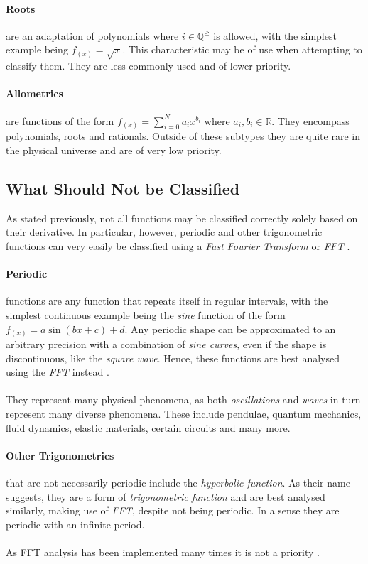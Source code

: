 \documentclass[main.tex]{subfiles}
\begin{document}
    \paragraph{Roots} are an adaptation of polynomials where $i \in \mathbb{Q}^\geq$ is allowed, with the simplest example being $f_{(x)}=\sqrt{x}$. This characteristic may be of use when attempting to classify them. They are less commonly used and of lower priority.
    
    \paragraph{Allometrics} are functions of the form $f_{(x)}=\sum_{i=0}^{N} a_i x^{b_i} $ where $a_i,b_i \in \mathbb{R}$. They encompass polynomials, roots and rationals. Outside of these subtypes they are quite rare in the physical universe and are of very low priority.
    
    \subsection{What Should Not be Classified}
    
    As stated previously, not all functions may be classified correctly solely based on their derivative. In particular, however, periodic and other trigonometric functions can very easily be classified using a \textit{Fast Fourier Transform} or \textit{FFT} \cite[Chapter~4]{fourierComp}.
    
    \paragraph{Periodic} functions are any function that repeats itself in regular intervals, with the simplest continuous example being the \textit{sine} function of the form $f_{(x)}=a \sin(b x + c) + d$. Any periodic shape can be approximated to an arbitrary precision with a combination of \textit{sine curves}, even if the shape is discontinuous, like the \textit{square wave}. Hence, these functions are best analysed using the \textit{FFT} instead \cite[Chapter~4]{fourierComp}.
    \\\\
    They represent many physical phenomena, as both \textit{oscillations} and \textit{waves} in turn represent many diverse phenomena. These include pendulae, quantum mechanics, fluid dynamics, elastic materials, certain circuits and many more.
    
    \paragraph{Other Trigonometrics} that are not necessarily periodic include the \textit{hyperbolic function}. As their name suggests, they are a form of \textit{trigonometric function} and are best analysed similarly, making use of \textit{FFT}, despite not being periodic. In a sense they are periodic with an infinite period. 
    \\\\
    As FFT analysis has been implemented many times it is not a priority \cite[Prologue,Preface]{fourierComp,numAnal}.
    
\end{document}
